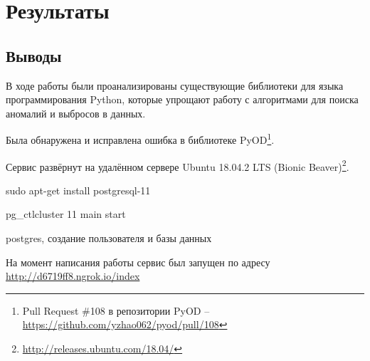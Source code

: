 \chapter{Результаты} \label{ch:ch4}

\section{Выводы} \label{ch:ch4/sect1}

В ходе работы были проанализированы существующие библиотеки для языка программирования Python, которые упрощают работу с алгоритмами для поиска аномалий и выбросов в данных.

Была обнаружена и исправлена ошибка в библиотеке PyOD\footnote{Pull Request \#108 в репозитории PyOD -- \url{https://github.com/yzhao062/pyod/pull/108}}.

Сервис развёрнут на удалённом сервере Ubuntu 18.04.2 LTS (Bionic Beaver)\footnote{\url{http://releases.ubuntu.com/18.04/}}.

sudo apt-get install postgresql-11

pg\_ctlcluster 11 main start

postgres, создание пользователя и базы данных

На момент написания работы сервис был запущен по адресу \url{http://d6719ff8.ngrok.io/index}

\clearpage